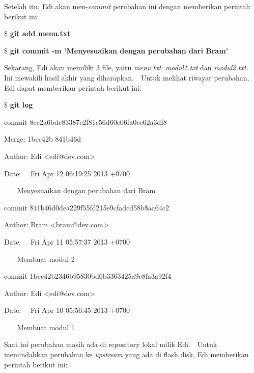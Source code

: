 \noindent 
\vspace{12pt}
\noindent 
\vspace{12pt}
\noindent 
Setelah itu, Edi akan men-\textit{commit} perubahan ini dengan memberikan perintah berikut ini: \par
\vspace{12pt}
\noindent 
 $  \$  $ \textbf{git add menu.txt} \par
\noindent 
 $  \$  $ \textbf{git commit -m 'Menyesuaikan dengan perubahan dari Bram'} \par
\noindent 
\vspace{12pt}
\noindent 
Sekarang, Edi akan memiliki 3 file, yaitu \textit{menu.txt}, \textit{modul1.txt} dan \textit{modul2.txt.} $  $ $  $ Ini mewakili hasil akhir yang diharapkan. $  $ $  $ Untuk melihat riwayat perubahan, Edi dapat memberikan perintah berikut ini: \par
\noindent 
 $  \$  $ \textbf{git log} \par
\noindent 
commit 8ce2a6bdc83387c2f81c56d60e06fa0ce62a3df8 \par
\noindent 
Merge: 1bcc42b 841b46d \par
\noindent 
Author: Edi <edi@dev.com> \par
\noindent 
Date:~~ Fri Apr 12 06:19:25 2013 +0700 \par
\noindent 
\vspace{12pt}
\noindent 
~~~ Menyesuaikan dengan perubahan dari Bram \par
\noindent 
\vspace{12pt}
\noindent 
commit 841b46d0dea229f55fd215e9cfadcd58b8aa64c2 \par
\noindent 
Author: Bram <bram@dev.com> \par
\noindent 
Date:~~ Fri Apr 11 05:57:37 2013 +0700 \par
\noindent 
\vspace{12pt}
\noindent 
~~~ Membuat modul 2 \par
\noindent 
\vspace{12pt}
\noindent 
commit 1bcc42b2346b95830bd6b3363425a9c8fa3a92f4 \par
\noindent 
Author: Edi <edi@dev.com> \par
\noindent 
Date:~~ Fri Apr 10 05:56:45 2013 +0700 \par
\noindent 
\vspace{12pt}
\noindent 
~~~ Membuat modul 1 \par
\noindent 
\vspace{12pt}
\noindent 
Saat ini perubahan masih ada di repository lokal milik Edi. $  $ $  $ Untuk memindahkan perubahan ke \textit{upstream} yang ada di flash disk, Edi memberikan perintah berikut ini: \par
